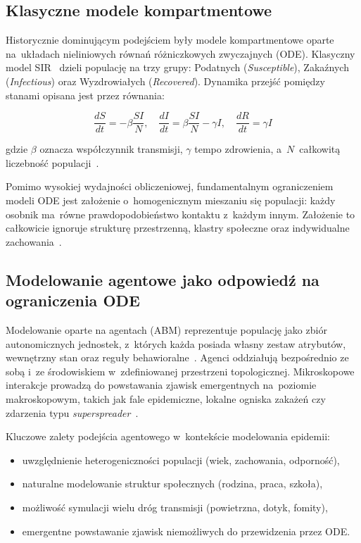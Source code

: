 \documentclass[polish]{projectreport}
\begin{document}
\subsection{Klasyczne modele kompartmentowe}
\label{sec:compartmental}

Historycznie dominującym podejściem były modele kompartmentowe oparte
na~układach nieliniowych równań różniczkowych zwyczajnych (ODE).
Klasyczny model SIR~\cite{kermack1927sir} dzieli populację na trzy grupy:
Podatnych (\textit{Susceptible}), Zakaźnych (\textit{Infectious}) oraz
Wyzdrowiałych (\textit{Recovered}). Dynamika przejść pomiędzy stanami
opisana jest przez równania:

\begin{equation}
  \frac{dS}{dt} = -\beta \frac{SI}{N}, \quad
  \frac{dI}{dt} = \beta \frac{SI}{N} - \gamma I, \quad
  \frac{dR}{dt} = \gamma I
  \label{eq:sir}
\end{equation}

\noindent gdzie $\beta$ oznacza współczynnik transmisji, $\gamma$ tempo
zdrowienia, a~$N$~całkowitą liczebność populacji~\cite{brauer2008compartmental}.

Pomimo wysokiej wydajności obliczeniowej, fundamentalnym ograniczeniem modeli
ODE jest założenie o~homogenicznym mieszaniu się populacji: każdy osobnik
ma~równe prawdopodobieństwo kontaktu z~każdym innym. Założenie to całkowicie
ignoruje strukturę przestrzenną, klastry społeczne oraz indywidualne
zachowania~\cite{eubank2004modelling}.

\subsection{Modelowanie agentowe jako odpowiedź na ograniczenia ODE}
\label{sec:abm-motivation}

Modelowanie oparte na agentach (ABM) reprezentuje populację jako zbiór
autonomicznych jednostek, z~których każda posiada własny zestaw atrybutów,
wewnętrzny stan oraz reguły behawioralne~\cite{bonabeau2002agent}. Agenci
oddziałują bezpośrednio ze sobą i~ze środowiskiem w~zdefiniowanej przestrzeni
topologicznej. Mikroskopowe interakcje prowadzą do powstawania zjawisk
emergentnych na~poziomie makroskopowym, takich jak fale epidemiczne, lokalne
ogniska zakażeń czy zdarzenia typu \textit{superspreader}~\cite{willem2017lessons}.

Kluczowe zalety podejścia agentowego w~kontekście modelowania epidemii:

\begin{itemize}
  \item uwzględnienie heterogeniczności populacji (wiek, zachowania, odporność),
  \item naturalne modelowanie struktur społecznych (rodzina, praca, szkoła),
  \item możliwość symulacji wielu dróg transmisji (powietrzna, dotyk, fomity),
  \item emergentne powstawanie zjawisk niemożliwych do przewidzenia przez ODE.
\end{itemize}
\end{document}
